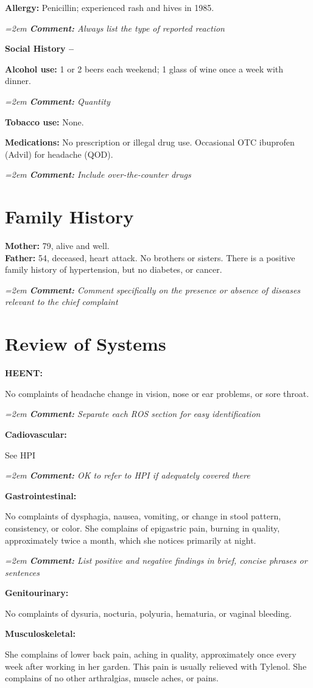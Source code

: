 \documentclass[11pt]{article}
\newcommand{\cm}[1]{%
  \par\nopagebreak\vspace{-0.2em}%
  \begingroup\small\itshape\color{cmtcolor}%
  \hangindent=2em \hangafter=0 \hspace*{1.2em}\textbf{Comment:} #1\par%
  \endgroup}
\newcommand{\lbl}[1]{\textbf{#1}\par\nopagebreak}
\begin{document}
\textbf{Allergy:} Penicillin; experienced rash and hives in 1985.
\cm{Always list the type of reported reaction}

\lbl{Social History --}
\textbf{Alcohol use:} 1 or 2 beers each weekend; 1 glass of wine once a week with dinner.
\cm{Quantity}

\textbf{Tobacco use:} None.

\textbf{Medications:} No prescription or illegal drug use. Occasional OTC ibuprofen (Advil) for headache (QOD).
\cm{Include over-the-counter drugs}

\section*{Family History}

\textbf{Mother:} 79, alive and well.\\
\textbf{Father:} 54, deceased, heart attack. No brothers or sisters. There is a positive family history of hypertension, but no diabetes, or cancer.
\cm{Comment specifically on the presence or absence of diseases relevant to the chief complaint}

\section*{Review of Systems}

\lbl{HEENT:}
No complaints of headache change in vision, nose or ear problems, or sore throat.
\cm{Separate each ROS section for easy identification}

\lbl{Cadiovascular:}
See HPI
\cm{OK to refer to HPI if adequately covered there}

\lbl{Gastrointestinal:}
No complaints of dysphagia, nausea, vomiting, or change in stool pattern, consistency, or color. She complains of epigastric pain, burning in quality, approximately twice a month, which she notices primarily at night.
\cm{List positive and negative findings in brief, concise phrases or sentences}

\lbl{Genitourinary:}
No complaints of dysuria, nocturia, polyuria, hematuria, or vaginal bleeding.

\lbl{Musculoskeletal:}
She complains of lower back pain, aching in quality, approximately once every week after working in her garden. This pain is usually relieved with Tylenol. She complains of no other arthralgias, muscle aches, or pains.
\end{document}
